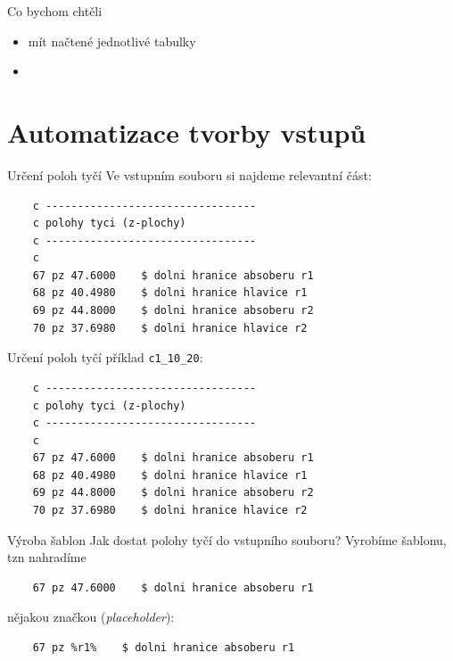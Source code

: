 \documentclass{beamer}
\begin{document}
\begin{frame}{Co bychom chtěli}
  \begin{itemize}
    \item mít načtené jednotlivé tabulky
  \end{itemize}
\end{frame}

\begin{frame}{}
  \begin{itemize}
    \item 
  \end{itemize}
\end{frame}

\section{Automatizace tvorby vstupů}

\begin{frame}[fragile]{Určení poloh tyčí}
  Ve vstupním souboru si najdeme relevantní část:
  \scriptsize
  \begin{verbatim}
    c ---------------------------------
    c polohy tyci (z-plochy)
    c ---------------------------------
    c
    67 pz 47.6000    $ dolni hranice absoberu r1
    68 pz 40.4980    $ dolni hranice hlavice r1
    69 pz 44.8000    $ dolni hranice absoberu r2
    70 pz 37.6980    $ dolni hranice hlavice r2
  \end{verbatim}
\end{frame}

\begin{frame}[fragile]{Určení poloh tyčí}
  příklad \texttt{c1\_10\_20}:
  \scriptsize
  \begin{verbatim}
    c ---------------------------------
    c polohy tyci (z-plochy)
    c ---------------------------------
    c
    67 pz 47.6000    $ dolni hranice absoberu r1
    68 pz 40.4980    $ dolni hranice hlavice r1
    69 pz 44.8000    $ dolni hranice absoberu r2
    70 pz 37.6980    $ dolni hranice hlavice r2
  \end{verbatim}
\end{frame}

\begin{frame}[fragile]{Výroba šablon}
  Jak dostat polohy tyčí do vstupního souboru? Vyrobíme šablonu, tzn nahradíme
  \begin{verbatim}
    67 pz 47.6000    $ dolni hranice absoberu r1
  \end{verbatim}
  \pause
  nějakou značkou (\emph{placeholder}):
  \begin{verbatim}
    67 pz %r1%    $ dolni hranice absoberu r1
  \end{verbatim}
\end{frame}
\end{document}
